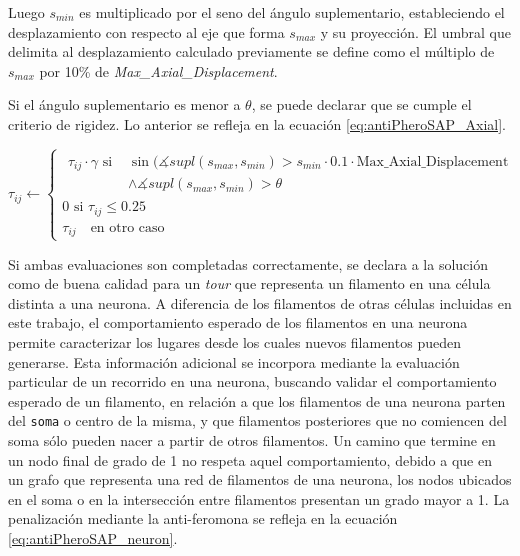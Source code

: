Luego $s_{min}$ es multiplicado por el seno del \'angulo suplementario, estableciendo el desplazamiento con respecto al eje que forma $s_{max}$ y su proyecci\'on. El umbral que delimita al desplazamiento calculado previamente se define como el m\'ultiplo de $s_{max}$ por 10\% de {\it Max\_Axial\_Displacement}. 

Si el \'angulo suplementario es menor a $\theta$, se puede declarar que se cumple el criterio de rigidez. Lo anterior se refleja en la ecuaci\'on \eqref{eq:antiPheroSAP_Axial}. 


\begin{equation}
    \tau_{ij} \leftarrow
        \begin{cases}
        \begin{split}
         \tau_{ij} \cdot \gamma \text{ si } & \sin(\measuredangle supl(s_{max},s_{min}) > s_{min} \cdot 0.1 \cdot \text{Max\_Axial\_Displacement} \\ & \land \measuredangle supl(s_{max},s_{min}) > \theta    
        \end{split}
        \\[3ex]
        
        \text{0 si } \tau_{ij} \leq 0.25 \\[3ex]
        \tau_{ij} \quad \text{en otro caso}
        \end{cases}
    \label{eq:antiPheroSAP_Axial}
\end{equation}

Si ambas evaluaciones son completadas correctamente, se declara a la soluci\'on como de buena calidad para un {\it tour} que representa un filamento en una c\'elula distinta a una neurona. A diferencia de los filamentos de otras c\'elulas incluidas en este trabajo, el comportamiento esperado de los filamentos en una neurona permite caracterizar los lugares desde los cuales nuevos filamentos pueden generarse. Esta informaci\'on adicional se incorpora mediante la evaluaci\'on particular de un recorrido en una neurona, buscando validar el comportamiento esperado de un filamento, en relaci\'on a que los filamentos de una neurona parten del {\tt soma} o centro de la misma, y que filamentos posteriores que no comiencen del soma s\'olo pueden nacer a partir de otros filamentos. Un camino que termine en un nodo final de grado de 1 no respeta aquel comportamiento, debido a que en un grafo que representa una red de filamentos de una neurona, los nodos ubicados en el soma o en la intersecci\'on entre filamentos presentan un grado mayor a 1. La penalizaci\'on mediante la anti-feromona se refleja en la ecuaci\'on \ref{eq:antiPheroSAP_neuron}.

